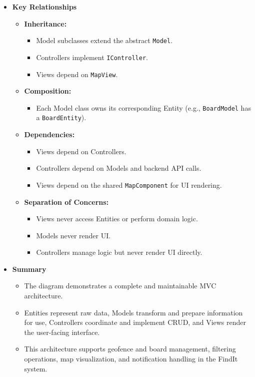 \begin{itemize}
    \item \textbf{Key Relationships}
    \begin{itemize}
        \item \textbf{Inheritance:}
        \begin{itemize}
            \item Model subclasses extend the abstract \texttt{Model}.
            \item Controllers implement \texttt{IController}.
            \item Views depend on \texttt{MapView}.
        \end{itemize}
        \item \textbf{Composition:}
        \begin{itemize}
            \item Each Model class owns its corresponding Entity (e.g., \texttt{BoardModel} has a \texttt{BoardEntity}).
        \end{itemize}
        \item \textbf{Dependencies:}
        \begin{itemize}
            \item Views depend on Controllers.
            \item Controllers depend on Models and backend API calls.
            \item Views depend on the shared \texttt{MapComponent} for UI rendering.
        \end{itemize}
        \item \textbf{Separation of Concerns:}
        \begin{itemize}
            \item Views never access Entities or perform domain logic.
            \item Models never render UI.
            \item Controllers manage logic but never render UI directly.
        \end{itemize}
    \end{itemize}

    \item \textbf{Summary}
    \begin{itemize}
        \item The diagram demonstrates a complete and maintainable MVC architecture.
        \item Entities represent raw data, Models transform and prepare information for use, Controllers coordinate and implement CRUD, and Views render the user-facing interface.
        \item This architecture supports geofence and board management, filtering operations, map visualization, and notification handling in the FindIt system.
    \end{itemize}

\end{itemize}
